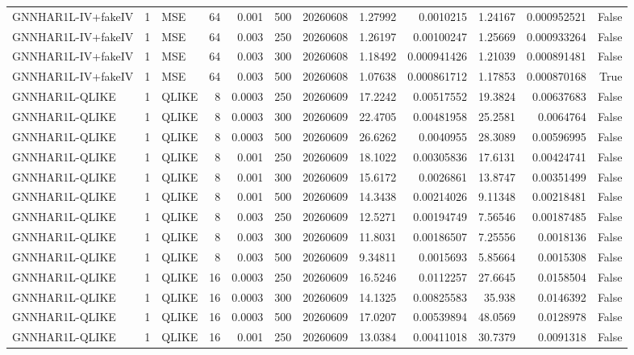 \begin{tabular}{lrlrrrrrrrrr}
GNNHAR1L-IV+fakeIV & 1 & MSE & 64 & 0.001 & 500 & 20260608 & 1.27992 & 0.0010215 & 1.24167 & 0.000952521 & False \\
GNNHAR1L-IV+fakeIV & 1 & MSE & 64 & 0.003 & 250 & 20260608 & 1.26197 & 0.00100247 & 1.25669 & 0.000933264 & False \\
GNNHAR1L-IV+fakeIV & 1 & MSE & 64 & 0.003 & 300 & 20260608 & 1.18492 & 0.000941426 & 1.21039 & 0.000891481 & False \\
GNNHAR1L-IV+fakeIV & 1 & MSE & 64 & 0.003 & 500 & 20260608 & 1.07638 & 0.000861712 & 1.17853 & 0.000870168 & True \\
GNNHAR1L-QLIKE & 1 & QLIKE & 8 & 0.0003 & 250 & 20260609 & 17.2242 & 0.00517552 & 19.3824 & 0.00637683 & False \\
GNNHAR1L-QLIKE & 1 & QLIKE & 8 & 0.0003 & 300 & 20260609 & 22.4705 & 0.00481958 & 25.2581 & 0.0064764 & False \\
GNNHAR1L-QLIKE & 1 & QLIKE & 8 & 0.0003 & 500 & 20260609 & 26.6262 & 0.0040955 & 28.3089 & 0.00596995 & False \\
GNNHAR1L-QLIKE & 1 & QLIKE & 8 & 0.001 & 250 & 20260609 & 18.1022 & 0.00305836 & 17.6131 & 0.00424741 & False \\
GNNHAR1L-QLIKE & 1 & QLIKE & 8 & 0.001 & 300 & 20260609 & 15.6172 & 0.0026861 & 13.8747 & 0.00351499 & False \\
GNNHAR1L-QLIKE & 1 & QLIKE & 8 & 0.001 & 500 & 20260609 & 14.3438 & 0.00214026 & 9.11348 & 0.00218481 & False \\
GNNHAR1L-QLIKE & 1 & QLIKE & 8 & 0.003 & 250 & 20260609 & 12.5271 & 0.00194749 & 7.56546 & 0.00187485 & False \\
GNNHAR1L-QLIKE & 1 & QLIKE & 8 & 0.003 & 300 & 20260609 & 11.8031 & 0.00186507 & 7.25556 & 0.0018136 & False \\
GNNHAR1L-QLIKE & 1 & QLIKE & 8 & 0.003 & 500 & 20260609 & 9.34811 & 0.0015693 & 5.85664 & 0.0015308 & False \\
GNNHAR1L-QLIKE & 1 & QLIKE & 16 & 0.0003 & 250 & 20260609 & 16.5246 & 0.0112257 & 27.6645 & 0.0158504 & False \\
GNNHAR1L-QLIKE & 1 & QLIKE & 16 & 0.0003 & 300 & 20260609 & 14.1325 & 0.00825583 & 35.938 & 0.0146392 & False \\
GNNHAR1L-QLIKE & 1 & QLIKE & 16 & 0.0003 & 500 & 20260609 & 17.0207 & 0.00539894 & 48.0569 & 0.0128978 & False \\
GNNHAR1L-QLIKE & 1 & QLIKE & 16 & 0.001 & 250 & 20260609 & 13.0384 & 0.00411018 & 30.7379 & 0.0091318 & False \\

\end{tabular}
